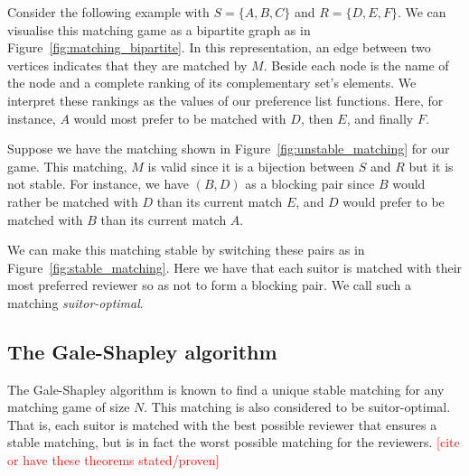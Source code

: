 \begin{example}\label{example:matching}
    Consider the following example with \(S = \{A, B, C\}\) and \(R = \{D, E,
    F\}\). We can visualise this matching game as a bipartite graph as in
    Figure~\ref{fig:matching_bipartite}. In this representation, an edge between
    two vertices indicates that they are matched by \(M\). Beside each node is 
    the name of the node and a complete ranking of its complementary set's 
    elements. We interpret these rankings as the values of our preference list 
    functions. Here, for instance, \(A\) would most prefer to be matched with 
    \(D\), then \(E\), and finally \(F\).
    
    \begin{figure}[h]
        \centering
        
    \end{figure}

    Suppose we have the matching shown in Figure~\ref{fig:unstable_matching} for
    our game. This matching, \(M\) is valid since it is a bijection between 
    \(S\) and \(R\) but it is not stable. For instance, we have \((B, D)\) as a
    blocking pair since \(B\) would rather be matched with \(D\) than its 
    current match \(E\), and \(D\) would prefer to be matched with \(B\) than
    its current match \(A\).

    \begin{figure}[h]
        \centering
        
    \end{figure}

    We can make this matching stable by switching these pairs as in
    Figure~\ref{fig:stable_matching}. Here we have that each suitor is matched 
    with their most preferred reviewer so as not to form a blocking pair. We 
    call such a matching \emph{suitor-optimal}.

    \begin{figure}[h]
        \centering
        
    \end{figure}
\end{example}

\subsection{The Gale-Shapley algorithm}\label{subsec:galeshapley}

The Gale-Shapley algorithm is known to find a unique stable matching for any 
matching game of size \(N\). This matching is also considered to be 
suitor-optimal. That is, each suitor is matched with the best possible reviewer
that ensures a stable matching, but is in fact the worst possible matching for 
the reviewers. \textcolor{red}{[cite or have these theorems stated/proven]} 


